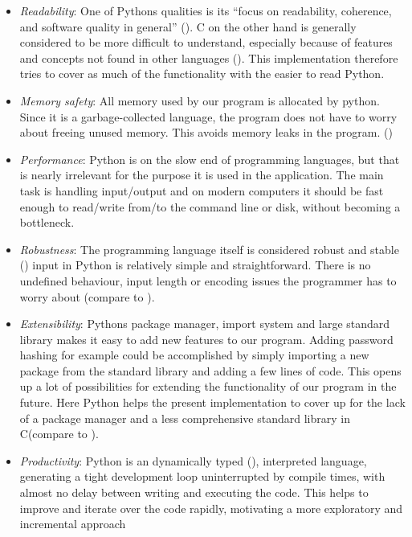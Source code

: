\begin{itemize}

\item
  \emph{Readability}: One of Pythons qualities is its ``focus on
  readability, coherence, and software quality in general''
  (\cite[p. 3]{learningpython}). C on the other hand is generally considered to be
  more difficult to understand, especially because of features and
  concepts not found in other languages (\cite[p. 5]{cmodern}). This implementation
  therefore tries to cover as much of the functionality with the easier
  to read Python.
\item
  \emph{Memory safety}: All memory used by our program is allocated by
  python. Since it is a garbage-collected language, the program does not
  have to worry about freeing unused memory. This avoids memory leaks in
  the program. (\cite[p. 18]{learningpython})
\item
  \emph{Performance}: Python is on the slow end of programming
  languages, but that is nearly irrelevant for the purpose it is used in
  the application. The main task is handling input/output and on modern
  computers it should be fast enough to read/write from/to the command
  line or disk, without becoming a bottleneck.
\item
  \emph{Robustness}: The programming language itself is considered
  robust and stable (\cite[p. 9]{learningpython}) input in Python is relatively
  simple and straightforward. There is no undefined behaviour, input
  length or encoding issues the programmer has to worry about (compare
  to \cite{scanf}).
\item
  \emph{Extensibility}: Pythons package manager, import system and large
  standard library makes it easy to add new features to our program.
  Adding password hashing for example could be accomplished by simply
  importing a new package from the standard library and adding a few
  lines of code. This opens up a lot of possibilities for extending the
  functionality of our program in the future. Here Python helps the
  present implementation to cover up for the lack of a package manager
  and a less comprehensive standard library in C(compare
  \cite{cbib} to \cite{pybib}).
\item
  \emph{Productivity}: Python is an dynamically typed (\cite[p. 9]{learningpython}), interpreted language, generating a tight development loop
  uninterrupted by compile times, with almost no delay between writing
  and executing the code. This helps to improve and iterate over the
  code rapidly, motivating a more exploratory and incremental approach

\end{itemize}
